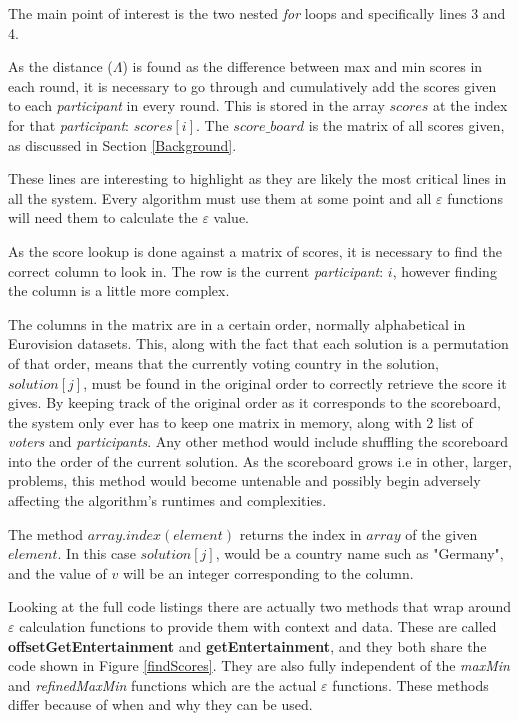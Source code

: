 \documentclass[12pt]{report}
\begin{document}
The main point of interest is the two nested \textit{for} loops and specifically lines 3 and 4.

As the distance ($\Lambda$) is found as the difference between max and min scores in each round, it is necessary to go through and cumulatively add the scores given to each \textit{participant} in every round. This is stored in the array $scores$ at the index for that \textit{participant}: $scores[i]$. The $score\_board$ is the matrix of all scores given, as discussed in Section \ref{Background}. 

These lines are interesting to highlight as they are likely the most critical lines in all the system. Every algorithm must use them at some point and all $\varepsilon$ functions will need them to calculate the $\varepsilon$ value.

As the score lookup is done against a matrix of scores, it is necessary to find the correct column to look in. The row is the current \textit{participant}: $i$, however finding the column is a little more complex. 

The columns in the matrix are in a certain order, normally alphabetical in Eurovision datasets. This, along with the fact that each solution is a permutation of that order, means that the currently voting country in the solution, $solution[j]$, must be found in the original order to correctly retrieve the score it gives. By keeping track of the original order as it corresponds to the scoreboard, the system only ever has to keep one matrix in memory, along with 2 list of \textit{voters} and \textit{participants}. Any other method would include shuffling the scoreboard into the order of the current solution. As the scoreboard grows i.e in other, larger, problems, this method would become untenable and possibly begin adversely affecting the algorithm's runtimes and complexities.

The method $array.index(element)$ returns the index in $array$ of the given $element$. In this case $solution[j]$, would be a country name such as "Germany", and the value of $v$ will be an integer corresponding to the column.

Looking at the full code listings there are actually two methods that wrap around $\varepsilon$ calculation functions to provide them with context and data. These are called \textbf{offsetGetEntertainment} and \textbf{getEntertainment}, and they both share the code shown in Figure \ref{findScores}. They are also fully independent of the \textit{maxMin} and \textit{refinedMaxMin} functions which are the actual $\varepsilon$ functions. These methods differ because of when and why they can be used.
\end{document}
